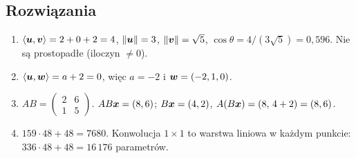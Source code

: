 \subsection*{Rozwiązania}
\begin{enumerate}
\item $\left\langle \bm{u},\bm{v}\right\rangle=2+0+2=4$, $\left\lVert \bm{u}\right\rVert=3$, $\left\lVert \bm{v}\right\rVert=\sqrt5$, $\cos\theta=4/(3\sqrt5)=0{,}596$. Nie są prostopadłe (iloczyn $\neq0$).
\item $\left\langle \bm{u},\bm{w}\right\rangle=a+2=0$, więc $a=-2$ i $\bm{w}=(-2,1,0)$.
\item $AB=\begin{pmatrix}2&6\\1&5\end{pmatrix}$. $AB\bm{x}=(8,6)$; $B\bm{x}=(4,2)$, $A(B\bm{x})=(8,\,4+2)=(8,6)$. \checkmark
\item $159\cdot48+48=7680$. Konwolucja $1\times1$ to warstwa liniowa w każdym punkcie: $336\cdot48+48=16\,176$ parametrów.
\end{enumerate}
